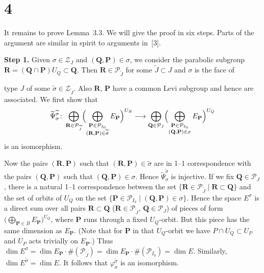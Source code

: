 \documentclass[10pt,a4paper]{article}
\theoremstyle{plain}
\theoremstyle{definition}
\theoremstyle{remark}
\newcommand{\cP}{\mathcal{P}}
\newcommand{\cZ}{\mathcal{Z}}
\newcommand{\bP}{\mathbf{P}}
\newcommand{\bQ}{\mathbf{Q}}
\newcommand{\bR}{\mathbf{R}}
\begin{document}
\section*{4}

It remains to prove Lemma~3.3. We will give the proof in six steps. Parts of the argument are similar in spirit to arguments in~[3].

\smallskip
\noindent\textbf{Step 1.} Given $\sigma \in \cZ_J$ and $(\bQ,\bP) \in \sigma$, we consider the parabolic subgroup $\bR = (\bQ \cap \bP)U_Q \subset \bQ$. Then $\bR \in \cP_{\widetilde J}$ for some $\widetilde J \subset J$ and $\sigma$ is the face of

\newpage
\noindent type $J$ of some $\widetilde\sigma\in\cZ_{\widetilde J}$. Also $\bR$, $\bP$ have a common Levi subgroup and hence are associated. We first show that
\begin{equation*}
\widetilde\Psi_{\sigma}^{\widetilde\sigma}\colon
\bigoplus_{\bR\in\cP_{\widetilde J}}
  \Bigl(\bigoplus_{\substack{\bP\in\cP_{I_0}\\(\bR,\bP)\in\widetilde\sigma}}E_{\bP}\Bigr)^{U_R}
\longrightarrow
\bigoplus_{\bQ\in\cP_J}
  \Bigl(\bigoplus_{\substack{\bP\in\cP_{I_0}\\(\bQ,\bP)\in\sigma}}E_{\bP}\Bigr)^{U_Q}
\end{equation*}
is an isomorphism.

Now the pairs $(\bR,\bP)$ such that $(\bR,\bP) \in \widetilde\sigma$ are in 1--1 correspondence with the pairs $(\bQ,\bP)$ such that $(\bQ,\bP) \in \sigma$. Hence $\widetilde\Psi_{\sigma}^{\widetilde\sigma}$ is injective. If we fix $\bQ \in \cP_J$, there is a natural 1--1 correspondence between the set $\{\bR \in \cP_{\widetilde J} \mid \bR \subset \bQ\}$ and the set of orbits of $U_Q$ on the set $\{\bP \in \cP_{I_0} \mid (\bQ,\bP) \in \sigma\}$. Hence the space $E^\sigma$ is a direct sum over all pairs $\bR \subset \bQ$ ($\bR \in \cP_{\widetilde J}$, $\bQ \in \cP_J$) of pieces of form $\bigl(\bigoplus_{\bP \in B}E_{\bP}\bigr)^{U_Q}$, where $\bP$ runs through a fixed $U_Q$-orbit. But this piece has the same dimension as $E_{\bP}$. (Note that for $\bP$ in that $U_Q$-orbit we have $P \cap U_Q \subset U_P$ and $U_P$ acts trivially on $E_{\bP}$.) Thus $\dim E^\sigma = \dim E_{\bP} \cdot \#(\cP_{\widetilde J}) = \dim E_{\bP} \cdot \#(\cP_{I_0}) = \dim E$. Similarly, $\dim E^{\widetilde\sigma} = \dim E$. It follows that $\varphi_{\sigma}^{\widetilde\sigma}$ is an isomorphism.
\end{document}

